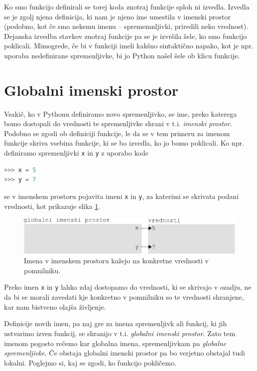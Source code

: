 Ko smo funkcijo definirali se torej koda znotraj funkcije sploh ni izvedla. Izvedla se je zgolj njena definicija, ki nam je njeno ime umestila v imenski prostor (podobno, kot če smo nekemu imenu -- sprememnljivki, priredili neko vrednost). Dejanska izvedba stavkov znotraj funkcije pa se je izvršila šele, ko smo funkcijo poklicali. Mimogrede, če bi v funkciji imeli kakšno sintaktično napako, kot je npr. uporaba nedefinirane spremenljivke, bi jo Python našel šele ob klicu funkcije.

\section{Globalni imenski prostor}
Vsakič, ko v Pythonu definiramo novo spremenljivko, se ime, preko katerega bomo dostopali do vrednosti te spremenljivke shrani v t.i. \emph{imenski prostor}. Podobno se zgodi ob definiciji funkcije, le da se v tem primeru za imenom funkcije skriva vsebina funkcije, ki se bo izvedla, ko jo bomo poklicali. Ko npr. definiramo spremenljivki \texttt{x} in \texttt{y} z uporabo kode
\begin{lstlisting}[language=Python, showstringspaces=false]
>>> x = 5
>>> y = 7
\end{lstlisting}
se v imenskem prostoru pojavita imeni \texttt{x} in \texttt{y}, za katerimi se skrivata podani vrednosti, kot prikazuje slika \ref{img:imenski_prostor_1}.
\begin{figure}
    \includegraphics[width=\linewidth]{img/imenski_prostor.pdf}
    \caption{Imena v imenskem prostoru kažejo na konkretne vrednosti v pomnilniku.}
    \label{img:imenski_prostor_1}
\end{figure}
Preko imen \texttt{x} in \texttt{y} lahko zdaj dostopamo do vrednosti, ki se skrivajo v ozadju, ne da bi se morali zavedati kje konkretno v pomnilniku so te vrednosti shranjene, kar nam bistveno olajša življenje.

Definicije novih imen, pa naj gre za imena spremenljivk ali funkcij, ki jih ustvarimo izven funkcij, se shranijo v t.i. \emph{globalni imenski prostor}. Zato tem imenom pogosto rečemo kar globalna imena, spremenljivkam pa \emph{globalne spremenljivke}. Če obstaja globalni imenski prostor pa bo verjetno obstajal tudi lokalni. Poglejmo si, kaj se zgodi, ko funkcijo pokličemo.

